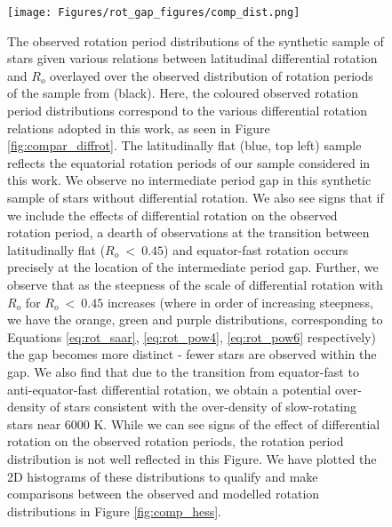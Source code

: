 \begin{figure}
\centering
 \texttt{[image: Figures/rot\_gap\_figures/comp\_dist.png]}
 \caption[The observed rotation period distributions of the synthetic sample of stars given various relations between latitudinal differential rotation and $R_o$ overlayed over the observed distribution of rotation periods of the \kepler{} sample from \citet{mcquillan_rotation_2014} (black).]{
 	The observed rotation period distributions of the synthetic sample of stars given various relations between latitudinal differential rotation and $R_o$ overlayed over the observed distribution of rotation periods of the \kepler{} sample from \citet{mcquillan_rotation_2014} (black). Here, the coloured observed rotation period distributions correspond to the various differential rotation relations adopted in this work, as seen in Figure \ref{fig:compar_diffrot}. The latitudinally flat (blue, top left) sample reflects the equatorial rotation periods of our sample considered in this work. We observe no intermediate period gap in this synthetic sample of stars without differential rotation. 
We also see signs that if we include the effects of differential rotation on the observed rotation period, a dearth of observations at the transition between latitudinally flat ($R_o \ < \ 0.45$) and equator-fast rotation occurs precisely at the location of the intermediate period gap.
Further, we observe that as the steepness of the scale of differential rotation with $R_o$ for $R_o \ < \ 0.45$ increases (where in order of increasing steepness, we have the orange, green and purple distributions, corresponding to Equations \ref{eq:rot_saar}, \ref{eq:rot_pow4}, \ref{eq:rot_pow6} respectively) the gap becomes more distinct - fewer stars are observed within the gap. 
We also find that due to the transition from equator-fast to anti-equator-fast differential rotation, we obtain a potential over-density of stars consistent with the over-density of slow-rotating stars near 6000 K.
While we can see signs of the effect of differential rotation on the observed rotation periods, the rotation period distribution is not well reflected in this Figure. We have plotted the 2D histograms of these distributions to qualify and make comparisons between the observed and modelled rotation distributions in Figure \ref{fig:comp_hess}.}
 \label{fig:comp_dist}
\end{figure}

